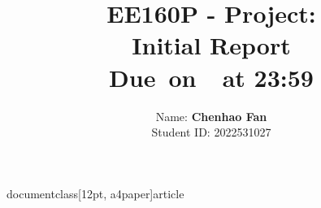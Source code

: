 documentclass[12pt, a4paper]{article}

\usepackage{answers}
\usepackage{graphicx}
\usepackage{color}
\usepackage{amsmath}
\usepackage{ragged2e}
\usepackage[left=0.8in, top=1in, right=0.8in, bottom=1in]{geometry}
\usepackage[normalem]{ulem}
\usepackage{multicol}
\usepackage{listings}
\usepackage{pgfplots}
\usepackage{hyperref}
\usepackage{amssymb}
\usepackage{fancyhdr}
\usepackage{extramarks}
\usepackage{amsthm}
\usepackage{amsfonts}
\usepackage{tikz}
\usepackage[plain]{algorithm}
\usepackage{algpseudocode}
\usepackage{enumerate}

\topmargin=-0.45in
\evensidemargin=0in
\oddsidemargin=0in
\textwidth=6.5in
\textheight=9.0in
\headsep=0.25in

\linespread{1.1}

\pagestyle{fancy}
\lhead{\rpAuthorName}
\chead{\rpClass : \rpTitle}
\rhead{\firstxmark}
\lfoot{\lastxmark}
\cfoot{\thepage}

\renewcommand\headrulewidth{0.4pt}
\renewcommand\footrulewidth{0.4pt}

\setlength\parindent{0pt}


\setcounter{secnumdepth}{0}
\setcounter{homeworkProblemCounter}{1}
\nobreak{}\nobreak{}






\newcommand{\rpTitle}{Initial Report}
\newcommand{\rpClass}{EE160P - Project}
\newcommand{\rpAuthorName}{Chenhao Fan}
\newcommand{\rpAuthorID}{2022531027}


\title{
    \vspace{2in}
    \textmd{\textbf{\rpClass:\\  \rpTitle}}\\
    \normalsize\vspace{0.1in}\small{Due\ on\ \rpDueDate\ at 23:59}\\
	\vspace{4in}
}

\author{
	Name: \textbf{\rpAuthorName} \\
	Student ID: \rpAuthorID}
\date{}

\renewcommand{\part}[1]{\textbf{\large Part \Alph{partCounter}}\stepcounter{partCounter}\\}















